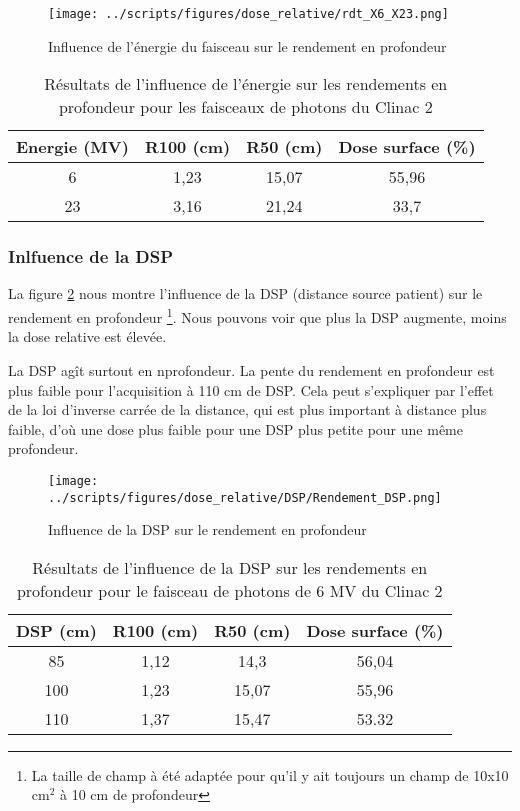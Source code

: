 \documentclass{article}
\begin{document}
\begin{figure}[h]
  \centering
  \texttt{[image: ../scripts/figures/dose\_relative/rdt\_X6\_X23.png]}
  \caption{Influence de l'énergie du faisceau sur le rendement en profondeur}
  \label{fig_rdt_energie}
\end{figure}

\begin{table}[h]
  \centering
  \begin{tabular}{cccc}
    \toprule
    \textbf{Energie (MV)} & \textbf{R100 (cm)} & \textbf{R50 (cm)} & \textbf{Dose surface (\%)} \\
    \toprule
    6 & 1,23 & 15,07 & 55,96 \\
    23 & 3,16 & 21,24 & 33,7 \\
    \bottomrule
  \end{tabular}
  \caption{Résultats de l'influence de l'énergie sur les rendements en profondeur pour les faisceaux de photons du Clinac 2}
  \label{table_rdt_energie}
\end{table}

\subsubsection{Inlfuence de la DSP}

La figure \ref*{fig_rdt_dsp} nous montre l'influence de la DSP (distance source patient) sur le rendement en profondeur \footnote{La taille de champ à été adaptée pour qu'il y ait toujours un champ de 10x10 cm$^2$ à 10 cm de profondeur}. Nous pouvons voir que plus la DSP augmente, moins la dose relative est élevée.

La DSP agît surtout en nprofondeur. La pente du rendement en profondeur est plus faible pour l'acquisition à 110 cm de DSP. Cela peut s'expliquer par l'effet de la loi d'inverse carrée de la distance, qui est plus important à distance plus faible, d'où une dose plus faible pour une DSP plus petite pour une même profondeur.

\begin{figure}[h]
  \centering
  \texttt{[image: ../scripts/figures/dose\_relative/DSP/Rendement\_DSP.png]}
  \caption{Influence de la DSP sur le rendement en profondeur}
  \label{fig_rdt_dsp}
\end{figure}

\begin{table}[h]
  \centering
  \begin{tabular}{cccc}
    \toprule
    \textbf{DSP (cm)} & \textbf{R100 (cm)} & \textbf{R50 (cm)} & \textbf{Dose surface (\%)} \\
    \toprule
    85 & 1,12 & 14,3 & 56,04 \\
    100 & 1,23 & 15,07 & 55,96 \\
    110 & 1,37 & 15,47 & 53.32 \\
    \bottomrule
  \end{tabular}
  \caption{Résultats de l'influence de la DSP sur les rendements en profondeur pour le faisceau de photons de 6 MV du Clinac 2}
  \label{table_rdt_dsp}
\end{table}
\end{document}
